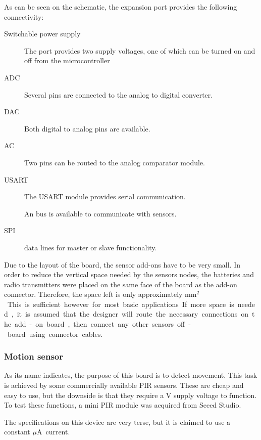 As can be seen on the schematic, the expansion port provides the following
connectivity:
\begin{description}
  \item [Switchable power supply] The port provides two supply voltages, one of
    which can be turned on and off from the microcontroller
  \item[ADC] Several pins are connected to the analog to digital converter.
  \item[DAC] Both digital to analog pins are available.
  \item[AC] Two pins can be routed to the analog comparator module.
  \item[USART] The USART module provides serial communication.
  \item[\IIC{}] An \IIC{} bus is available to communicate with sensors.
  \item[SPI] data lines for master or slave functionality.
\end{description}

Due to the layout of the board, the sensor add-ons have to be very small. In
order to reduce the vertical space needed by the sensors nodes, the batteries
and radio transmitters were placed on the same face of the board as the add-on
connector. Therefore, the space left is only approximately \unit[22x20]{mm$^2$}.
This is sufficient however for most basic applications. If more space is needed,
it is assumed that the designer will route the necessary connections on the
add-on board, then connect any other sensors off-board using connector cables.


\subsubsection{Motion sensor}

As its name indicates, the purpose of this board is to detect movement. This
task is achieved by some commercially available PIR sensors. These are cheap and
easy to use, but the downside is that they require a \unit[5]{V} supply voltage
to function. To test these functions, a mini PIR module was acquired from Seeed
Studio.

The specifications on this device are very terse, but it is claimed to use a
constant \unit[50]{$\mu$A} current.

